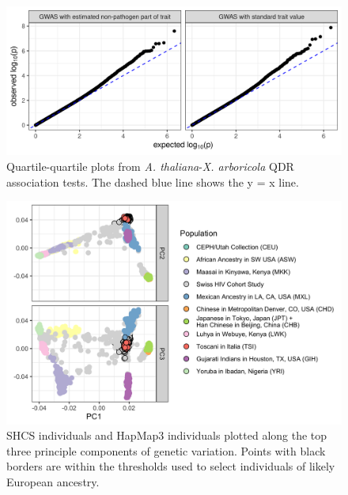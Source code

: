 \documentclass[11pt]{article}
\begin{document}
\begin{doublespace}
\begin{figure}[H]
\begin{center}
\includegraphics[width = \linewidth]{figures/qq_plots_arabidopsis_xanthomonas.png}
	\caption{Quartile-quartile plots from \emph{A. thaliana}-\emph{X. arboricola} QDR association tests. The dashed blue line shows the y = x line.}
	\label{fig:qq-plots-qdr}
	\end{center}
\end{figure}

\begin{figure}[H]
	\includegraphics[width=\linewidth]{figures/host_genotype_pca.png}
	\caption{SHCS individuals and HapMap3 individuals plotted along the top three principle components of genetic variation. Points with black borders are within the thresholds used to select individuals of likely European ancestry.}
	\label{fig:PCA}
\end{figure}

\end{doublespace}  %

\newpage
\end{document}
